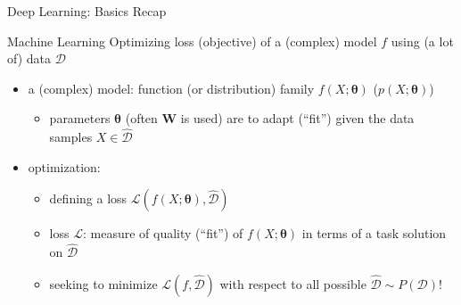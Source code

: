 \begin{frame}{Deep Learning: Basics Recap}
\protect\hypertarget{deep-learning-basics-recap}{}
\begin{block}{Machine Learning}
\protect\hypertarget{machine-learning}{}
Optimizing loss (objective) of a (complex) model \(f\) using (a lot of)
data \(\mathcal{D}\)
\end{block}

\begin{itemize}
\tightlist
\item
  a (complex) model: function (or distribution) family
  \(f(X;\boldsymbol{\theta})\) (\(p(X;\boldsymbol{\theta})\))

  \begin{itemize}
  \tightlist
  \item
    parameters \(\boldsymbol{\theta}\) (often \(\mathbf{W}\) is used)
    are to adapt (``fit'') given the data samples
    \(X \in \mathcal{\hat{D}}\)
  \end{itemize}
\item
  optimization:

  \begin{itemize}
  \tightlist
  \item
    defining a loss
    \(\mathcal{L}(f(X;\boldsymbol{\theta}),\mathcal{\hat{D}})\)
  \item
    loss \(\mathcal{L}\): measure of quality (``fit'') of
    \(f(X;\boldsymbol{\theta})\) in terms of a task solution on
    \(\mathcal{\hat{D}}\)
  \item
    seeking to minimize \(\mathcal{L}(f,\mathcal{\hat{D}})\) with
    respect to all possible \(\mathcal{\hat{D}} \sim P(\mathcal{D})\)!
  \end{itemize}
\end{itemize}

\end{frame}

